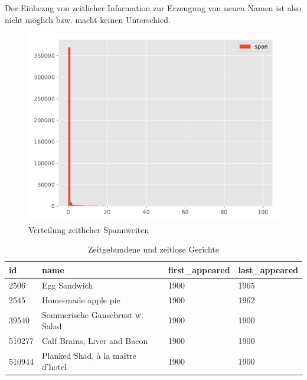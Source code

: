 Der Einbezug von zeitlicher Information zur Erzeugung von neuen Namen ist also nicht möglich bzw. macht keinen Unterschied.

\begin{figure}
    \centering
    \includegraphics[width=0.75\linewidth]{images/analysis/histogram-datespans.pdf}
    \caption{Verteilung zeitlicher Spannweiten}
    \label{fig:hist-dates-datespans}
\end{figure}



\begin{center}
    \begin{table}
        \centering
        \small
        \begin{tabular}{ |l|l|l|l| }

            \hline
            \textbf{id} & \textbf{name} & \textbf{first\_appeared} & \textbf{last\_appeared} \\
            \hline
            2506 & Egg Sandwich & 1900 & 1965 \\
            2545 & Home-made apple pie & 1900 & 1962 \\
            39540 & Sommerische Gansebrust w. Salad & 1900 & 1900 \\
            510277 & Calf Brains, Liver and Bacon & 1900 & 1900 \\
            510944 & Planked Shad, à la maître d'hotel & 1900 & 1900 \\
            \hline
        \end{tabular} \\

        \caption{Zeitgebundene und zeitlose Gerichte}
        \label{tab:data-1900}
    \end{table}
\end{center}

